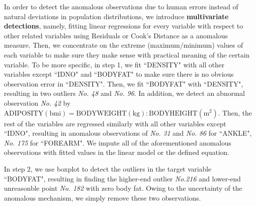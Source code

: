 \documentclass[11pt, letterpaper]{article}
\begin{document}
In order to detect the anomalous observations due to human errors instead of natural deviations in population distributions, we introduce \textbf{multivariate detections}, namely, fitting linear regressions for every variable with respect to other related variables using Residuals or Cook's Distance as a anomalous measure. Then, we concentrate on the extreme (maximum/minimum) values of each variable to make sure they make sense with practical meaning of the certain variable. To be more specific, in step 1, we fit ``DENSITY" with all other variables except ``IDNO" and ``BODYFAT" to make sure there is no obvious observation error in ``DENSITY". Then, we fit ``BODYFAT" with ``DENSITY", resulting in two outliers \emph{No. 48} and \emph{No. 96}. In addition, we detect an abnormal observation \emph{No. 42} by $\mathrm{ADIPOSITY(bmi)} = \mathrm{BODY WEIGHT(kg)} : \mathrm{BODY HEIGHT(m^2)}$. Then, the rest of the variables are regressed similarly with all other variables except ``IDNO", resulting in anomalous observations of \emph{No. 31} and \emph{No. 86} for ``ANKLE", \emph{No. 175} for ``FOREARM". We impute all of the aforementioned anomalous observations with fitted values in the linear model or the defined equation. 

In step 2, we use boxplot to detect the outliers in the target variable ``BODYFAT", resulting in finding the higher-end outlier \emph{No.216} and lower-end unreasonble point \emph{No. 182} with zero body fat. Owing to the uncertainty of the anomalous mechanism, we simply remove these two observations. 


\pagebreak
{}
\end{document}
